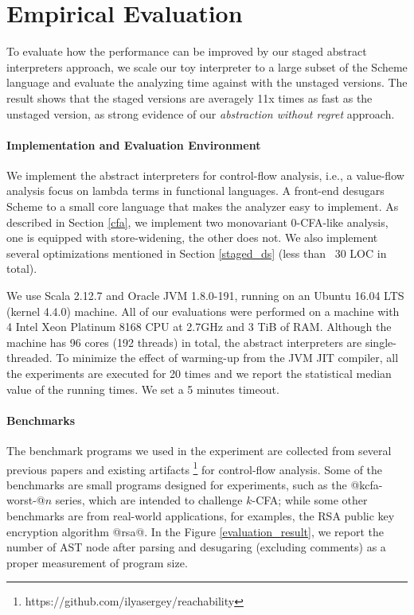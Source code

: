 \section{Empirical Evaluation} \label{evaluation}

To evaluate how the performance can be improved by our staged abstract interpreters
approach, we scale our toy interpreter to a large subset of the Scheme language
and evaluate the analyzing time against with the unstaged versions. The result
shows that the staged versions are averagely 11x times as fast as the unstaged
version, as strong evidence of our \textit{abstraction without regret}
approach.

\paragraph{Implementation and Evaluation Environment}
We implement the abstract interpreters for control-flow analysis, i.e., a
value-flow analysis focus on lambda terms in functional languages. A front-end
desugars Scheme to a small core language that makes the analyzer easy to
implement. As described in Section \ref{cfa}, we implement two monovariant
0-CFA-like analysis, one is equipped with store-widening, the other does not.
We also implement several optimizations mentioned in Section \ref{staged_ds} 
(less than ~30 LOC in total).

We use Scala 2.12.7 and Oracle JVM 1.8.0-191, running on an Ubuntu 16.04 LTS
(kernel 4.4.0) machine. All of our evaluations were performed on a machine with 4 Intel
Xeon Platinum 8168 CPU at 2.7GHz and 3 TiB of RAM. Although the machine has 96
cores (192 threads) in total, the abstract interpreters are single-threaded.
To minimize the effect of warming-up from the JVM JIT compiler, all the
experiments are executed for 20 times and we report the statistical median value
of the running times. We set a 5 minutes timeout.

\paragraph{Benchmarks}
The benchmark programs we used in the experiment are collected from several
previous papers \cite{Johnson:2013:OAA:2500365.2500604, ashley:practical,
DBLP:journals/corr/abs-1102-3676} and existing artifacts
\footnote{https://github.com/ilyasergey/reachability} for control-flow analysis.
Some of the benchmarks are small programs designed for experiments, such as the
@kcfa-worst-@$n$ series, which are intended to challenge $k$-CFA; while some
other benchmarks are from real-world applications, for examples, the RSA public
key encryption algorithm @rsa@. In the Figure \ref{evaluation_result}, we report
the number of AST node after parsing and desugaring (excluding comments) as a
proper measurement of program size.

